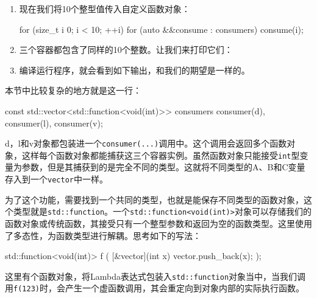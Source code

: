 \begin{enumerate}
\item 现在我们将10个整型值传入自定义函数对象：

\begin{codebox}[cpp]
for (size_t i {0}; i < 10; ++i) {
    for (auto &&consume : consumers) {
        consume(i);
    }
}
\end{codebox}

\item 三个容器都包含了同样的10个整数。让我们来打印它们：

\begin{codebox}[cpp]
    print(d);
    print(l);
    print(v);
}
\end{codebox}

\item 编译运行程序，就会看到如下输出，和我们的期望是一样的。


\end{enumerate}


本节中比较复杂的地方就是这一行：

\begin{codebox}[cpp]
const std::vector<std::function<void(int)>> consumers
    {consumer(d), consumer(l), consumer(v)};
\end{codebox}

d，l和v对象都包装进一个\texttt{consumer(...)}调用中。这个调用会返回多个函数对象，这样每个函数对象都能捕获这三个容器实例。虽然函数对象只能接受\texttt{int}型变量为参数，但是其捕获到的是完全不同的类型。这就将不同类型的A、B和C变量存入到一个\texttt{vector}中一样。

为了这个功能，需要找到一个共同的类型，也就是能保存不同类型的函数对象，这个类型就是\texttt{std::function}。一个\texttt{std::function<void(int)>}对象可以存储我们的函数对象或传统函数，其接受只有一个整型参数和返回为空的函数类型。这里使用了多态性，为函数类型进行解耦。思考如下的写法：

\begin{codebox}[cpp]
std::function<void(int)> f (
    [&vector](int x) { vector.push_back(x); });
\end{codebox}

这里有个函数对象，将Lambda表达式包装入\texttt{std::function}对象当中，当我们调用\texttt{f(123)}时，会产生一个虚函数调用，其会重定向到对象内部的实际执行函数。

